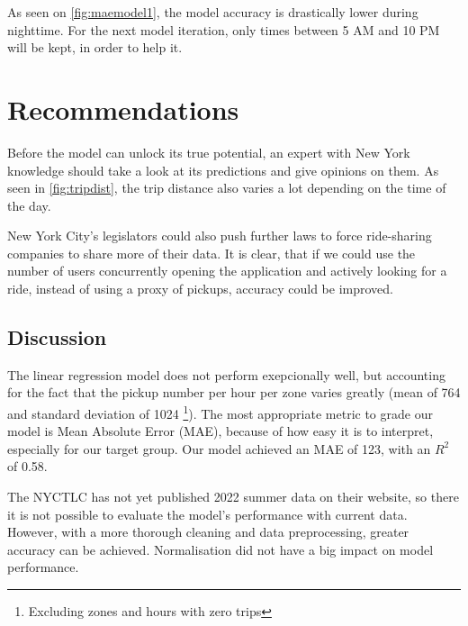 \documentclass[11pt]{article}
\begin{document}
As seen on \autoref{fig:maemodel1}, the model accuracy is drastically lower during nighttime. For the next model iteration, only times between 5 AM and 10 PM will be kept, in order to help it. 

\section{Recommendations}

Before the model can unlock its true potential, an expert with New York knowledge should take a look at its predictions and give opinions on them. As seen in \autoref{fig:tripdist}, the trip distance also varies a lot depending on the time of the day.

New York City's legislators could also push further laws to force ride-sharing companies to share more of their data. It is clear, that if we could use the number of users concurrently opening the application and actively looking for a ride, instead of using a proxy of pickups, accuracy could be improved.

\subsection{Discussion} \label{discussion}

The linear regression model does not perform exepcionally well, but accounting for the fact that the pickup number per hour per zone varies greatly (mean of 764 and standard deviation of 1024 \footnote{Excluding zones and hours with zero trips}). The most appropriate metric to grade our model is Mean Absolute Error (MAE), because of how easy it is to interpret, especially for our target group. Our model achieved an MAE of 123, with an $R^2$ of 0.58.

The NYCTLC has not yet published 2022 summer data on their website, so there it is not possible to evaluate the model's performance with current data. However, with a more thorough cleaning and data preprocessing, greater accuracy can be achieved. Normalisation did not have a big impact on model performance.
\end{document}
